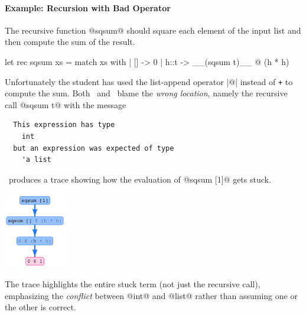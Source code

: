 \paragraph{Example: Recursion with Bad Operator}
The recursive function @sqsum@ should square each
element of the input list and then compute the sum
of the result.
%
\begin{ecode}
  let rec sqsum xs = match xs with
    | [] -> 0
    | h::t -> __(sqsum t)__ @ (h * h)
\end{ecode}
%
Unfortunately the student has used the list-append
operator |@| instead of \texttt{+} to compute the sum.
%
Both \ocaml\ and \sherrloc\ blame the \emph{wrong location},
namely the recursive call @sqsum t@ with the message
%
\begin{verbatim}
  This expression has type
    int
  but an expression was expected of type
    'a list
\end{verbatim}
%
\toolname\ produces a trace showing how the evaluation of
@sqsum [1]@ gets stuck.
%
\begin{center}
  \includegraphics[height=125px]{sqsum.png}
\end{center}
%
The trace highlights the entire stuck term
(not just the recursive call), emphasizing
the \emph{conflict} between @int@ and @list@
rather than assuming one or the other is correct.

